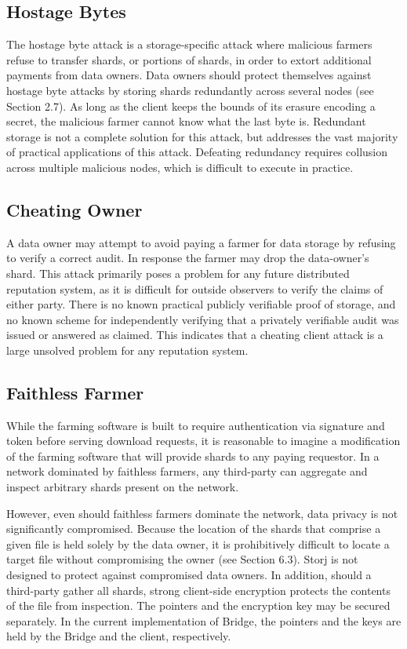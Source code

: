\documentclass[a4paper,10pt]{article}
\begin{document}
\subsection{Hostage Bytes}
The hostage byte attack is a storage-specific attack where malicious farmers refuse to transfer shards, or portions of shards, in order to extort additional payments from data owners. Data owners should protect themselves against hostage byte attacks by storing shards redundantly across several nodes (see Section 2.7). As long as the client keeps the bounds of its erasure encoding a secret, the malicious farmer cannot know what the last byte is. Redundant storage is not a complete solution for this attack, but addresses the vast majority of practical applications of this attack. Defeating redundancy requires collusion across multiple malicious nodes, which is difficult to execute in practice.

\subsection{Cheating Owner}
A data owner may attempt to avoid paying a farmer for data storage by refusing to verify a correct audit. In response the farmer may drop the data-owner’s shard. This attack primarily poses a problem for any future distributed reputation system, as it is difficult for outside observers to verify the claims of either party. There is no known practical publicly verifiable proof of storage, and no known scheme for independently verifying that a privately verifiable audit was issued or answered as claimed. This indicates that a cheating client attack is a large unsolved problem for any reputation system.

\subsection{Faithless Farmer}
While the farming software is built to require authentication via signature and token before serving download requests, it is reasonable to imagine a modification of the farming software that will provide shards to any paying requestor. In a network dominated by faithless farmers, any third-party can aggregate and inspect arbitrary shards present on the network.

However, even should faithless farmers dominate the network, data privacy is not significantly compromised. Because the location of the shards that comprise a given file is held solely by the data owner, it is prohibitively difficult to locate a target file without compromising the owner (see Section 6.3). Storj is not designed to protect against compromised data owners. In addition, should a third-party gather all shards, strong client-side encryption protects the contents of the file from inspection. The pointers and the encryption key may be secured separately. In the current implementation of Bridge, the pointers and the keys are held by the Bridge and the client, respectively.
\end{document}
